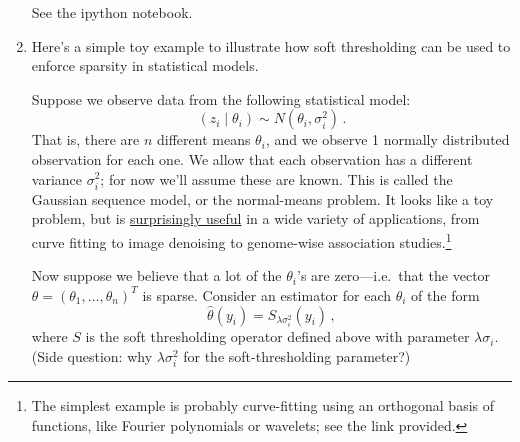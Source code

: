 \documentclass{article}
\begin{document}
\begin{enumerate}[label=(\Alph*)]
{\color{blue}
See the ipython notebook.
}

\item Here's a simple toy example to illustrate how soft thresholding can be used to enforce sparsity in statistical models.

Suppose we observe data from the following statistical model:
$$
(z_{i} \mid \theta_i) \sim N(\theta_i, \sigma^2_i) \, .
$$
That is, there are $n$ different means $\theta_i$, and we observe 1 normally distributed observation for each one.  We allow that each observation has a different variance $\sigma^2_i$; for now we'll assume these are known.  This is called the Gaussian sequence model, or the normal-means problem.  It looks like a toy problem, but is \href{http://statweb.stanford.edu/~imj/GE06-11-13.pdf}{surprisingly useful} in a wide variety of applications, from curve fitting to image denoising to genome-wise association studies.\footnote{The simplest example is probably curve-fitting using an orthogonal basis of functions, like Fourier polynomials or wavelets; see the link provided.}

Now suppose we believe that a lot of the $\theta_i$'s are zero---i.e.~that the vector $\theta = (\theta_1, \ldots, \theta_n)^T$ is sparse.  Consider an estimator for each $\theta_i$ of the form
$$
\widehat{\theta}(y_i) = S_{\lambda \sigma_i^2}(y_i) \, ,
$$
where $S$ is the soft thresholding operator defined above with parameter $\lambda \sigma_i$.  (Side question: why $\lambda \sigma_i^2$ for the soft-thresholding parameter?)


\end{enumerate}
\end{document}
